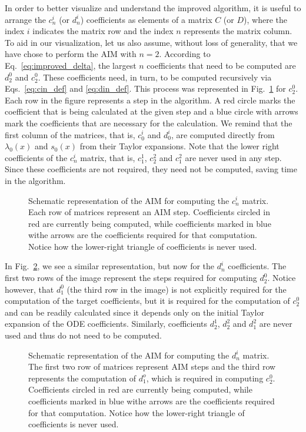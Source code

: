 In order to better visualize and understand the improved algorithm, it is useful to arrange the $c^i_n$ (or $d^i_n$) coefficients as elements of a matrix $C$ (or $D$), where the index $i$ indicates the matrix row and the index $n$ represents the matrix column. To aid in our visualization, let us also assume, without loss of generality, that we have chose to perform the AIM with $n=2$. According to Eq.~\eqref{eq:improved_delta}, the largest $n$ coefficients that need to be computed  are $d^0_2$ and $c^0_2$. These coefficients need, in turn, to be computed recursively via Eqs.~\eqref{eq:cin_def} and \eqref{eq:din_def}. This process was represented in Fig.~\ref{fig:aim_coeffs_c} for $c^0_2$. Each row in the figure represents a step in the algorithm. A red circle marks the coefficient that is being calculated at the given step and a blue circle with arrows mark the coefficients that are necessary for the calculation. We remind that the first column of the matrices, that is, $c^i_0$ and $d^i_0$, are computed directly from $\lambda_0(x)$ and $s_0(x)$ from their Taylor expansions. Note that the lower right coefficients of the $c^i_n$ matrix, that is, $c^1_1$, $c^2_2$ and $c^2_1$ are never used in any step. Since these coefficients are not required, they need not be computed, saving time in the algorithm.

\begin{figure}[!ht]
  \centering
  
  \caption{Schematic representation of the AIM for computing the $c^i_n$ matrix. Each row of matrices represent an AIM step. Coefficients circled in red are currently being computed, while coefficients marked in blue withe arrows are the coefficients required for that computation. Notice how the lower-right triangle of coefficients is never used.}
  \label{fig:aim_coeffs_c}
\end{figure}

In  Fig.~\ref{fig:aim_coeffs_d}, we see a similar representation, but now for the $d^i_n$ coefficients. The first two rows of the image represent the steps required for computing $d^0_2$. Notice however, that $d^0_1$ (the third row in the image) is not explicitly required for the computation of the target coefficients, but it is required for the computation of $c^0_2$ and can be readily calculated since it depends only on the initial Taylor expansion of the ODE coefficients. Similarly, coefficients $d^1_2$, $d^2_2$ and $d^2_1$ are never used and thus do not need to be computed.

\begin{figure}[!ht]
  \centering
  
  \caption{Schematic representation of the AIM for computing the $d^i_n$ matrix. The first two row of matrices represent AIM steps and the third row represents the computation of $d^o_1$, which is required in computing $c^0_2$. Coefficients circled in red are currently being computed, while coefficients marked in blue withe arrows are the coefficients required for that computation. Notice how the lower-right triangle of coefficients is never used.}
  \label{fig:aim_coeffs_d}
\end{figure}

